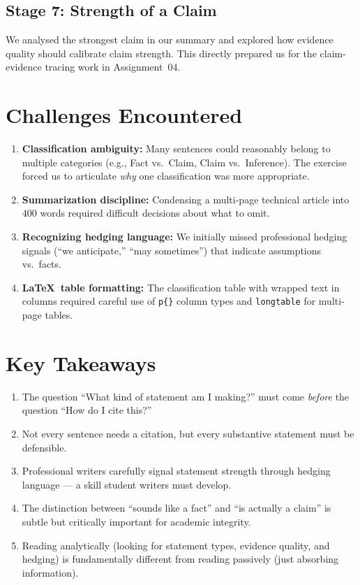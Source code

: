 \documentclass[11pt, a4paper]{article}
\begin{document}
\subsection{Stage 7: Strength of a Claim}
We analysed the strongest claim in our summary and explored how evidence quality should calibrate claim strength. This directly prepared us for the claim-evidence tracing work in Assignment~04.

\section{Challenges Encountered}

\begin{enumerate}[nosep]
    \item \textbf{Classification ambiguity:} Many sentences could reasonably belong to multiple categories (e.g., Fact vs.\ Claim, Claim vs.\ Inference). The exercise forced us to articulate \emph{why} one classification was more appropriate.
    \item \textbf{Summarization discipline:} Condensing a multi-page technical article into 400 words required difficult decisions about what to omit.
    \item \textbf{Recognizing hedging language:} We initially missed professional hedging signals (``we anticipate,'' ``may sometimes'') that indicate assumptions vs.\ facts.
    \item \textbf{\LaTeX\ table formatting:} The classification table with wrapped text in columns required careful use of \texttt{p\{\}} column types and \texttt{longtable} for multi-page tables.
\end{enumerate}

\section{Key Takeaways}

\begin{enumerate}[nosep]
    \item The question ``What kind of statement am I making?'' must come \emph{before} the question ``How do I cite this?''
    \item Not every sentence needs a citation, but every substantive statement must be defensible.
    \item Professional writers carefully signal statement strength through hedging language --- a skill student writers must develop.
    \item The distinction between ``sounds like a fact'' and ``is actually a claim'' is subtle but critically important for academic integrity.
    \item Reading analytically (looking for statement types, evidence quality, and hedging) is fundamentally different from reading passively (just absorbing information).
\end{enumerate}
\end{document}

